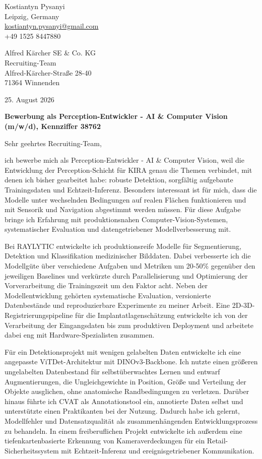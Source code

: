 \documentclass[11pt,a4paper]{article}
\begin{document}
\begin{flushright}
Kostiantyn Pysanyi\\
Leipzig, Germany\\
\href{mailto:kostiantyn.pysanyi@gmail.com}{kostiantyn.pysanyi@gmail.com}\\
+49 1525 8447880
\end{flushright}

Alfred Kärcher SE \& Co. KG\\
Recruiting-Team\\
Alfred-Kärcher-Straße 28-40\\
71364 Winnenden

\begin{flushright}
25. August 2026
\end{flushright}

\textbf{Bewerbung als Perception-Entwickler - AI \& Computer Vision (m/w/d), Kennziffer 38762}

Sehr geehrtes Recruiting-Team,

ich bewerbe mich als Perception-Entwickler - AI \& Computer Vision, weil die Entwicklung der Perception-Schicht für KIRA genau die Themen verbindet, mit denen ich bisher gearbeitet habe: robuste Detektion, sorgfältig aufgebaute Trainingsdaten und Echtzeit-Inferenz. Besonders interessant ist für mich, dass die Modelle unter wechselnden Bedingungen auf realen Flächen funktionieren und mit Sensorik und Navigation abgestimmt werden müssen. Für diese Aufgabe bringe ich Erfahrung mit produktionsnahen Computer-Vision-Systemen, systematischer Evaluation und datengetriebener Modellverbesserung mit.

Bei RAYLYTIC entwickelte ich produktionsreife Modelle für Segmentierung, Detektion und Klassifikation medizinischer Bilddaten. Dabei verbesserte ich die Modellgüte über verschiedene Aufgaben und Metriken um 20-50\% gegenüber den jeweiligen Baselines und verkürzte durch Parallelisierung und Optimierung der Vorverarbeitung die Trainingszeit um den Faktor acht. Neben der Modellentwicklung gehörten systematische Evaluation, versionierte Datenbestände und reproduzierbare Experimente zu meiner Arbeit. Eine 2D-3D-Registrierungspipeline für die Implantatlagenschätzung entwickelte ich von der Verarbeitung der Eingangsdaten bis zum produktiven Deployment und arbeitete dabei eng mit Hardware-Spezialisten zusammen.

Für ein Detektionsprojekt mit wenigen gelabelten Daten entwickelte ich eine angepasste ViTDet-Architektur mit DINOv3-Backbone. Ich nutzte einen größeren ungelabelten Datenbestand für selbstüberwachtes Lernen und entwarf Augmentierungen, die Ungleichgewichte in Position, Größe und Verteilung der Objekte ausglichen, ohne anatomische Randbedingungen zu verletzen. Darüber hinaus führte ich CVAT als Annotationstool ein, annotierte Daten selbst und unterstützte einen Praktikanten bei der Nutzung. Dadurch habe ich gelernt, Modellfehler und Datensatzqualität als zusammenhängenden Entwicklungsprozess zu behandeln. In einem freiberuflichen Projekt entwickelte ich außerdem eine tiefenkartenbasierte Erkennung von Kameraverdeckungen für ein Retail-Sicherheitssystem mit Echtzeit-Inferenz und ereignisgetriebener Kommunikation.
\end{document}
